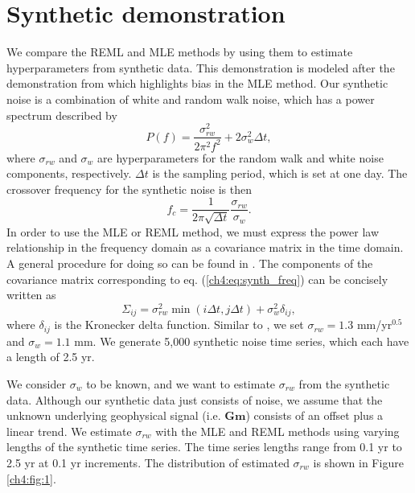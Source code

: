 \section{Synthetic demonstration}\label{ch4:sec:3}
We compare the REML and MLE methods by using them to estimate hyperparameters from synthetic data. This demonstration is modeled after the demonstration from \citet{Langbein2012} which highlights bias in the MLE method. Our synthetic noise is a combination of white and random walk noise, which has a power spectrum described by
\begin{equation}\label{ch4:eq:synth_freq}
P(f) = \frac{\sigma_{rw}^2}{2\pi^2 f^2} + 2\sigma_w^2\Delta t,
\end{equation}  
where $\sigma_{rw}$ and $\sigma_w$ are hyperparameters for the random walk and white noise components, respectively. $\Delta t$ is the sampling period, which is set at one day. The crossover frequency for the synthetic noise is then
\begin{equation}
f_c = \frac{1}{2\pi\sqrt{\Delta t}}\frac{\sigma_{rw}}{\sigma_w}.  
\end{equation}
In order to use the MLE or REML method, we must express the power law relationship in the frequency domain as a covariance matrix in the time domain. A general procedure for doing  so can be found in \citet{Langbein2004}. The components of the covariance matrix corresponding to eq. (\ref{ch4:eq:synth_freq}) can be concisely written as
\begin{equation}
\Sigma_{ij} = \sigma_{rw}^2 \min(i\Delta t,j\Delta t) + \sigma_w^2 \delta_{ij},
\end{equation} 
where $\delta_{ij}$ is the Kronecker delta function. Similar to \citet{Langbein2012}, we set $\sigma_{rw} = 1.3$ mm/yr$^{0.5}$ and $\sigma_w = 1.1$ mm. We generate 5,000 synthetic noise time series, which each have a length of 2.5 yr. 

We consider $\sigma_w$ to be known, and we want to estimate $\sigma_{rw}$ from the synthetic data. Although our synthetic data just consists of noise, we assume that the unknown underlying geophysical signal (i.e. $\mathbf{G}\mathbf{m}$) consists of an offset plus a linear trend. We estimate $\sigma_{rw}$ with the MLE and REML methods using varying lengths of the synthetic time series. The time series lengths range from 0.1 yr to 2.5 yr at 0.1 yr increments. The distribution of estimated $\sigma_{rw}$ is shown in Figure \ref{ch4:fig:1}. 

